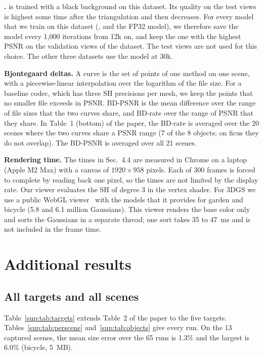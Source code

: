 \noindent\textbf{\NeRFSyn.} \MS is trained with a black background on this dataset. Its quality on the test views is highest some time after the triangulation and then decreases. For every model that we train on this dataset (\BM, \MSc and the FP32 model), we therefore save the model every 1{,}000 iterations from 12k on, and keep the one with the highest PSNR on the validation views of the dataset. The test views are not used for this choice. The other three datasets use the model at 30k.

\noindent\textbf{Bjontegaard deltas.} A curve is the set of points of one method on one scene, with a piecewise-linear interpolation over the logarithm of the file size. For a baseline codec, which has three SH precisions per mesh, we keep the points that no smaller file exceeds in PSNR. BD-PSNR is the mean difference over the range of file sizes that the two curves share, and BD-rate over the range of PSNR that they share. In Table~1 (bottom) of the paper, the BD-rate is averaged over the 20 scenes where the two curves share a PSNR range (7 of the 8 objects; on ficus they do not overlap). The BD-PSNR is averaged over all 21 scenes.

\noindent\textbf{Rendering time.} The times in Sec.~4.4 are measured in Chrome on a laptop (Apple M2 Max) with a canvas of $1920\times958$ pixels. Each of 300 frames is forced to complete by reading back one pixel, so the times are not limited by the display rate. Our viewer evaluates the SH of degree 3 in the vertex shader. For 3DGS we use a public WebGL viewer~\cite{splatviewer} with the models that it provides for garden and bicycle (5.8 and 6.1 million Gaussians). This viewer renders the base color only and sorts the Gaussians in a separate thread; one sort takes 35 to 47~ms and is not included in the frame time.

\section{Additional results}
\label{sup:results}

\subsection{All targets and all scenes}
Table~\ref{sup:tab:targets} extends Table~2 of the paper to the five targets. Tables~\ref{sup:tab:perscene} and~\ref{sup:tab:objects} give every run. On the 13 captured scenes, the mean size error over the 65 runs is 1.3\% and the largest is 6.0\% (bicycle, 5~MB).

